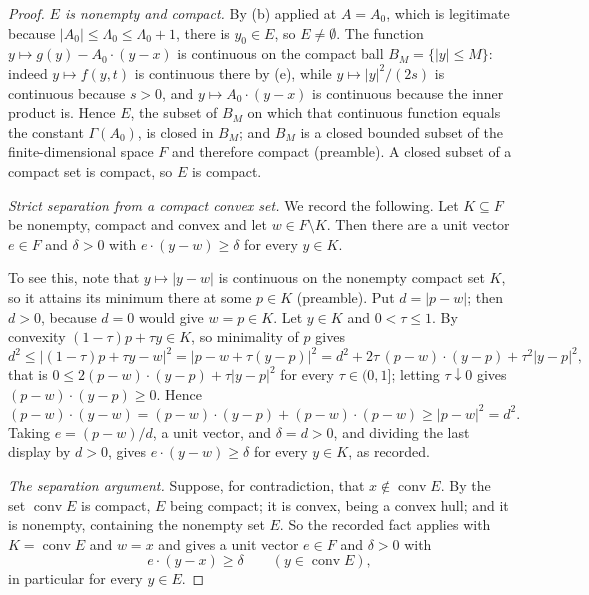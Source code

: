 \begin{proof}
\emph{$E$ is nonempty and compact.}
By (b) applied at $A=A_0$, which is legitimate because
$|A_0|\le\Lambda_0\le\Lambda_0+1$, there is $y_0\in E$, so $E\ne\emptyset$. The
function $y\mapsto g(y)-A_0\cdot(y-x)$ is continuous on the compact ball
$B_M=\{|y|\le M\}$: indeed $y\mapsto f(y,t)$ is continuous there by (e), while
$y\mapsto|y|^2/(2s)$ is continuous because $s>0$, and
$y\mapsto A_0\cdot(y-x)$ is continuous because the inner product is. Hence $E$,
the subset of $B_M$ on which that continuous function equals the constant
$\Gamma(A_0)$, is closed in $B_M$; and $B_M$ is a closed bounded subset of the
finite-dimensional space $F$ and therefore compact (preamble). A closed subset of
a compact set is compact, so $E$ is compact.

\emph{Strict separation from a compact convex set.}
We record the following. Let $K\subseteq F$ be nonempty, compact and convex and
let $w\in F\setminus K$. Then there are a unit vector $e\in F$ and $\delta>0$
with $e\cdot(y-w)\ge\delta$ for every $y\in K$.

To see this, note that $y\mapsto|y-w|$ is continuous on the nonempty compact set
$K$, so it attains its minimum there at some $p\in K$ (preamble). Put
$d=|p-w|$; then $d>0$, because $d=0$ would give $w=p\in K$. Let $y\in K$ and
$0<\tau\le1$. By convexity $(1-\tau)p+\tau y\in K$, so minimality of $p$ gives
\[
  d^2\le\bigl|(1-\tau)p+\tau y-w\bigr|^2
      =\bigl|p-w+\tau(y-p)\bigr|^2
      =d^2+2\tau\,(p-w)\cdot(y-p)+\tau^2|y-p|^2 ,
\]
that is $0\le2(p-w)\cdot(y-p)+\tau|y-p|^2$ for every $\tau\in(0,1]$; letting
$\tau\downarrow0$ gives $(p-w)\cdot(y-p)\ge0$. Hence
\[
  (p-w)\cdot(y-w)=(p-w)\cdot(y-p)+(p-w)\cdot(p-w)\ge|p-w|^2=d^2 .
\]
Taking $e=(p-w)/d$, a unit vector, and $\delta=d>0$, and dividing the last
display by $d>0$, gives $e\cdot(y-w)\ge\delta$ for every $y\in K$, as recorded.

\emph{The separation argument.}
Suppose, for contradiction, that $x\notin\operatorname{conv}E$. By
 the set $\operatorname{conv}E$ is compact, $E$
being compact; it is convex, being a convex hull; and it is nonempty, containing
the nonempty set $E$. So the recorded fact applies with $K=\operatorname{conv}E$
and $w=x$ and gives a unit vector $e\in F$ and $\delta>0$ with
\begin{equation}\label{eq:behm-sep}
  e\cdot(y-x)\ge\delta\qquad(y\in\operatorname{conv}E),
\end{equation}
in particular for every $y\in E$.


\end{proof}
